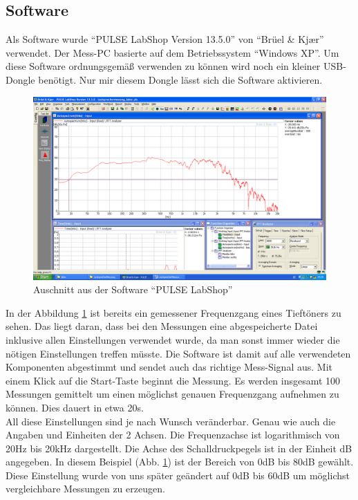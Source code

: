\newpage
\subsection*{Software}\label{subsec:5.2.1}
Als Software wurde \enquote{PULSE LabShop Version 13.5.0} von \enquote{Brüel \& Kj\ae r} verwendet. Der Mess-PC basierte auf dem Betriebssystem \enquote{Windows XP}. Um diese Software ordnungsgemäß verwenden zu können wird noch ein kleiner USB-Dongle benötigt. Nur mir diesem Dongle lässt sich die Software aktivieren.
\begin{figure} [H]
	\centering
	\includegraphics[width=1\textwidth]{img/LSMessung/VisatonMitSilikonMitWolle.png}
	\caption{Auschnitt aus der Software \enquote{PULSE LabShop}}
	\label{fig:5.2.1.1}
\end{figure}
In der Abbildung \ref{fig:5.2.1.1} ist bereits ein gemessener Frequenzgang eines Tieftöners zu sehen. Das liegt daran, dass bei den Messungen eine abgespeicherte Datei inklusive allen Einstellungen verwendet wurde, da man sonst immer wieder die nötigen Einstellungen treffen müsste. Die Software ist damit auf alle verwendeten Komponenten abgestimmt und sendet auch das richtige Mess-Signal aus. Mit einem Klick auf die Start-Taste beginnt die Messung. Es werden insgesamt 100 Messungen gemittelt um einen möglichst genauen Frequenzgang aufnehmen zu können. Dies dauert in etwa 20s. \\
All diese Einstellungen sind je nach Wunsch veränderbar. Genau wie auch die Angaben und Einheiten der 2 Achsen. Die Frequenzachse ist logarithmisch von 20Hz bis 20kHz dargestellt. Die Achse des Schalldruckpegels ist in der Einheit dB angegeben. In diesem Beispiel (Abb. \ref{fig:5.2.1.1}) ist der Bereich von 0dB bis 80dB gewählt. Diese Einstellung wurde von uns später geändert auf 0dB bis 60dB um möglichst vergleichbare Messungen zu erzeugen.

